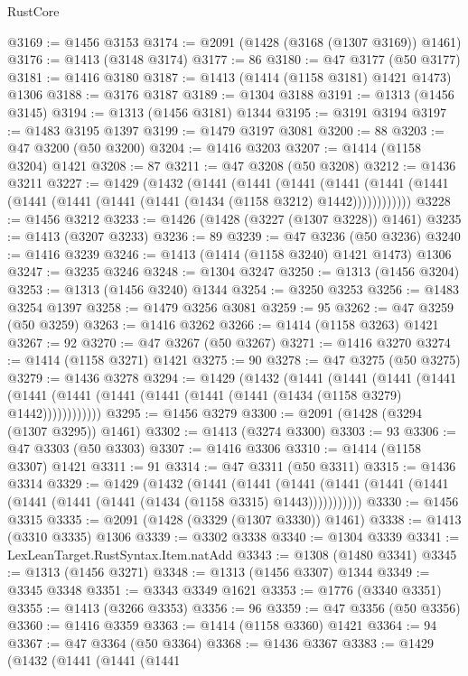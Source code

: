 \begin{lexlean}{RustCore}
\begin{coremodule}
@3169 := @1456 @3153
@3174 := @2091 (@1428 (@3168 (@1307 @3169)) @1461)
@3176 := @1413 (@3148 @3174)
@3177 := 86
@3180 := @47 @3177 (@50 @3177)
@3181 := @1416 @3180
@3187 := @1413 (@1414 (@1158 @3181) @1421 @1473) @1306
@3188 := @3176 @3187
@3189 := @1304 @3188
@3191 := @1313 (@1456 @3145)
@3194 := @1313 (@1456 @3181) @1344
@3195 := @3191 @3194
@3197 := @1483 @3195 @1397
@3199 := @1479 @3197 @3081
@3200 := 88
@3203 := @47 @3200 (@50 @3200)
@3204 := @1416 @3203
@3207 := @1414 (@1158 @3204) @1421
@3208 := 87
@3211 := @47 @3208 (@50 @3208)
@3212 := @1436 @3211
@3227 := @1429
    (@1432
      (@1441
        (@1441
          (@1441
            (@1441 (@1441 (@1441 (@1441 (@1441 (@1441 (@1441 (@1434 (@1158 @3212) @1442))))))))))))
@3228 := @1456 @3212
@3233 := @1426 (@1428 (@3227 (@1307 @3228)) @1461)
@3235 := @1413 (@3207 @3233)
@3236 := 89
@3239 := @47 @3236 (@50 @3236)
@3240 := @1416 @3239
@3246 := @1413 (@1414 (@1158 @3240) @1421 @1473) @1306
@3247 := @3235 @3246
@3248 := @1304 @3247
@3250 := @1313 (@1456 @3204)
@3253 := @1313 (@1456 @3240) @1344
@3254 := @3250 @3253
@3256 := @1483 @3254 @1397
@3258 := @1479 @3256 @3081
@3259 := 95
@3262 := @47 @3259 (@50 @3259)
@3263 := @1416 @3262
@3266 := @1414 (@1158 @3263) @1421
@3267 := 92
@3270 := @47 @3267 (@50 @3267)
@3271 := @1416 @3270
@3274 := @1414 (@1158 @3271) @1421
@3275 := 90
@3278 := @47 @3275 (@50 @3275)
@3279 := @1436 @3278
@3294 := @1429
    (@1432
      (@1441
        (@1441
          (@1441
            (@1441 (@1441 (@1441 (@1441 (@1441 (@1441 (@1441 (@1434 (@1158 @3279) @1442))))))))))))
@3295 := @1456 @3279
@3300 := @2091 (@1428 (@3294 (@1307 @3295)) @1461)
@3302 := @1413 (@3274 @3300)
@3303 := 93
@3306 := @47 @3303 (@50 @3303)
@3307 := @1416 @3306
@3310 := @1414 (@1158 @3307) @1421
@3311 := 91
@3314 := @47 @3311 (@50 @3311)
@3315 := @1436 @3314
@3329 := @1429
    (@1432
      (@1441
        (@1441
          (@1441 (@1441 (@1441 (@1441 (@1441 (@1441 (@1441 (@1434 (@1158 @3315) @1443)))))))))))
@3330 := @1456 @3315
@3335 := @2091 (@1428 (@3329 (@1307 @3330)) @1461)
@3338 := @1413 (@3310 @3335) @1306
@3339 := @3302 @3338
@3340 := @1304 @3339
@3341 := LexLeanTarget.RustSyntax.Item.natAdd
@3343 := @1308 (@1480 @3341)
@3345 := @1313 (@1456 @3271)
@3348 := @1313 (@1456 @3307) @1344
@3349 := @3345 @3348
@3351 := @3343 @3349 @1621
@3353 := @1776 (@3340 @3351)
@3355 := @1413 (@3266 @3353)
@3356 := 96
@3359 := @47 @3356 (@50 @3356)
@3360 := @1416 @3359
@3363 := @1414 (@1158 @3360) @1421
@3364 := 94
@3367 := @47 @3364 (@50 @3364)
@3368 := @1436 @3367
@3383 := @1429
    (@1432
      (@1441
        (@1441
          (@1441

\end{coremodule}
\end{lexlean}
